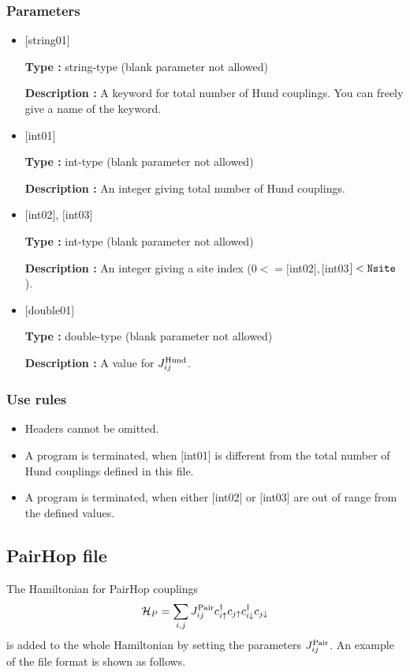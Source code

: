 \subsubsection{Parameters}
 \begin{itemize}

   \item  $[$string01$]$
   
    {\bf Type :} string-type (blank parameter not allowed)

   {\bf Description :}  A keyword for total number of Hund couplings. You can freely give a name of the keyword.

   \item  $[$int01$]$
   
    {\bf Type :} int-type (blank parameter not allowed)

   {\bf Description :} An integer giving total number of Hund couplings.

  \item  $[$int02$]$, $[$int03$]$
  
 {\bf Type :} int-type (blank parameter not allowed)

{\bf Description :} An integer giving a site index ($0<= [$int02$], [$int03$]<\verb|Nsite|$).
 
 \item  $[$double01$]$
   
   {\bf Type :} double-type (blank parameter not allowed)

  {\bf Description :}  A value for $J_{ij}^{\rm Hund}$.
  
\end{itemize}

\subsubsection{Use rules}
\begin{itemize}
\item Headers cannot be omitted. 
\item A program is terminated, when $[$int01$]$ is different from the total number of Hund couplings defined in this file.
\item A program is terminated, when either $[$int02$]$ or $[$int03$]$ are out of range from the defined values.
\end{itemize}

\newpage
\subsection{PairHop file}
The Hamiltonian for PairHop couplings
\begin{equation}
{\cal H}_P=\sum_{i,j}J_{ij}^{\rm Pair} c_ {i \uparrow}^{\dag}c_{j\uparrow}c_{i \downarrow}^{\dag}c_{j  \downarrow}
\end{equation}
is added to the whole Hamiltonian by setting the parameters $J_{ij}^{\rm Pair}$.
An example of the file format is shown as follows.

